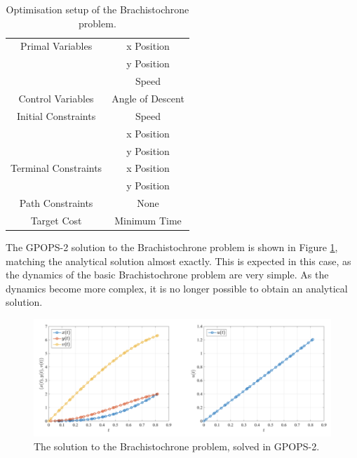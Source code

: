 \begin{table}
	\centering
	\begin{tabular}{|c|c|}
		\hline Primal Variables  & x Position\\& y Position\\& Speed\\ 
		\hline Control Variables  & Angle of Descent\\ 
		\hline Initial Constraints  & Speed\\ & x Position\\ & y Position\\
		\hline Terminal Constraints &  x Position\\ & y Position\\
		\hline Path Constraints & None \\ 
		\hline Target Cost & Minimum Time \\ 
		\hline 
	\end{tabular} 
	\caption{Optimisation setup of the Brachistochrone problem. }
	\label{tab:brachistochrone}
\end{table}


The GPOPS-2 solution to the Brachistochrone problem is shown in Figure \ref{fig:Brachistochrone}, matching the analytical solution almost exactly. This is expected in this case, as the dynamics of the basic Brachistochrone problem are very simple. As the dynamics become more complex, it is no longer possible to obtain an analytical solution.  

\begin{figure}[ht]
	\centering
	\includegraphics[width=0.9\linewidth]{figures/4_LODESTAR/Brachistochrone}
	\caption{The solution to the Brachistochrone problem, solved in GPOPS-2\cite{Rao2010}.}
	\label{fig:Brachistochrone}
\end{figure}





